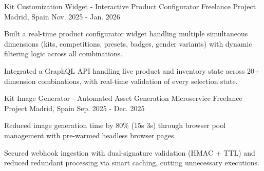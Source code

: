 

\begin{cventries}

  \cventry
  {Kit Customization Widget - Interactive Product Configurator} %
  {Freelance Project} %
  {Madrid, Spain} %
  {Nov. 2025 - Jan. 2026} %
  {
    \begin{cvitems}
    \item {Built a real-time product configurator widget handling multiple simultaneous dimensions (kits, competitions, presets, badges, gender variants) with dynamic filtering logic across all combinations.}
    \item {Integrated a GraphQL API handling live product and inventory state across 20+ dimension combinations, with real-time validation of every selection state.}
    \end{cvitems}
  }
  \vspace{9mm}
  \cventry
  {Kit Image Generator - Automated Asset Generation Microservice} %
  {Freelance Project} %
  {Madrid, Spain} %
  {Sep. 2025 - Dec. 2025} %
  {
    \begin{cvitems}
    \item {Reduced image generation time by 80\% (15s \textrightarrow{} 3s) through browser pool management with pre-warmed headless browser pages.}
    \item {Secured webhook ingestion with dual-signature validation (HMAC + TTL) and reduced redundant processing via smart caching, cutting unnecessary executions.}
    \end{cvitems}
  }

\end{cventries}
